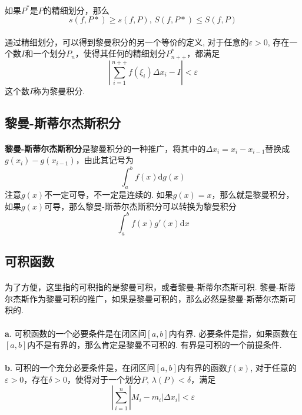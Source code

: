 \paragraph{}
如果$P^*$是$P$的精细划分，那么
$$
s(f, P*) \geq s(f, P), \, S(f, P*) \leq S(f, P)
$$

\paragraph{}
通过精细划分，可以得到黎曼积分的另一个等价的定义, 对于任意的$\varepsilon > 0$, 存在一个数$I$和一个划分$P_n$，使得其任何的精细划分$P_{n++}^*$，都满足
$$
|\sum_{i = 1}^{n++} f(\xi_i) \Delta x_i - I| < \varepsilon
$$
这个数$I$称为黎曼积分.

\subsection{黎曼-斯蒂尔杰斯积分}
\paragraph{}
\textbf{黎曼-斯蒂尔杰斯积分}是黎曼积分的一种推广，将其中的$\Delta x_i = x_i - x_{i - 1}$替换成$g(x_i) - g(x_{i-1})$，由此其记号为
$$
\int_a^b f(x)\mathrm{d} g(x)
$$
注意$g(x)$不一定可导，不一定是连续的. 如果$g(x) = x$，那么就是黎曼积分，如果$g(x)$可导，那么黎曼-斯蒂尔杰斯积分可以转换为黎曼积分
$$
\int_a^b f(x) g'(x) \mathrm{d} x
$$

\subsection{可积函数}

\paragraph{}
为了方便，这里指的可积指的是黎曼可积，或者黎曼-斯蒂尔杰斯可积. 黎曼-斯蒂尔杰斯作为黎曼可积的推广，如果是黎曼可积的，那么必然是黎曼-斯蒂尔杰斯可积的. 

\paragraph{}
\textbf{a}. 可积函数的一个必要条件是在闭区间$[a, b]$内有界. 必要条件是指，如果函数在$[a, b]$内不是有界的，那么肯定是黎曼不可积的. 有界是可积的一个前提条件.

\paragraph{}
\textbf{b}. 可积的一个充分必要条件是，在闭区间$[a, b]$内有界的函数$f(x)$, 对于任意的$\varepsilon > 0$，存在$\delta > 0$，使得对于一个划分$P$, $\lambda(P) < \delta$，满足
$$
|\sum_{i = 1}^n |M_i - m_i| \Delta x_i | < \varepsilon
$$


